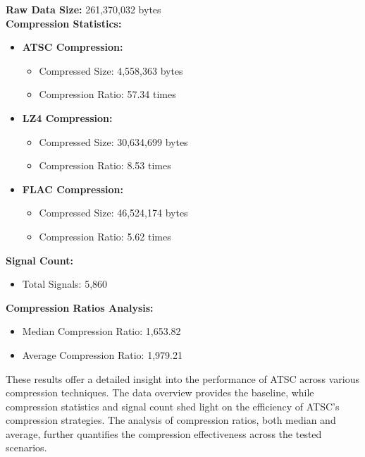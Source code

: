 \documentclass[conference]{IEEEtran}
\begin{document}
\textbf{Raw Data Size:} 261,370,032 bytes \\
\textbf{Compression Statistics:}

\begin{itemize}
    \item \textbf{ATSC Compression:}
    \begin{itemize}
        \item Compressed Size: 4,558,363 bytes
        \item Compression Ratio: 57.34 times
    \end{itemize}
    \item \textbf{LZ4 Compression:}
    \begin{itemize}
        \item Compressed Size: 30,634,699 bytes
        \item Compression Ratio: 8.53 times
    \end{itemize}
    \item \textbf{FLAC Compression:}
    \begin{itemize}
        \item Compressed Size: 46,524,174 bytes
        \item Compression Ratio: 5.62 times
    \end{itemize}
\end{itemize}

\textbf{Signal Count:}

\begin{itemize}
    \item Total Signals: 5,860
\end{itemize}

\textbf{Compression Ratios Analysis:}

\begin{itemize}
    \item Median Compression Ratio: 1,653.82
    \item Average Compression Ratio: 1,979.21
\end{itemize}


\vspace{10pt}
These results offer a detailed insight into the performance of ATSC across various compression techniques. The data overview provides the baseline, while compression statistics and signal count shed light on the efficiency of ATSC's compression strategies. The analysis of compression ratios, both median and average, further quantifies the compression effectiveness across the tested scenarios. 
 
\end{document}
